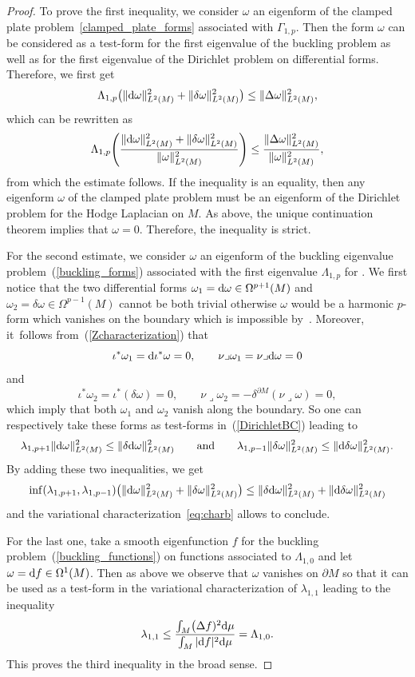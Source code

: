 \documentclass[10pt,a4paper]{amsart}
\numberwithin{equation}{section}
\theoremstyle{definition}
\begin{document}
\begin{proof} To prove the first inequality, we consider $\omega$ an eigenform of the clamped plate problem~\eqref{clamped_plate_forms} associated with $\Gamma_{1,p}$. Then the form $\omega$ can be considered as a test-form for the first eigenvalue of the buckling problem as well as for the first eigenvalue of the Dirichlet problem on differential forms. Therefore, we first get
\[
\Lambda_{1,p}\bigl(\|{\rm d}\omega\|^2_{L^2(M)} +\|\delta \omega\|^2_{L^2(M)}\bigr) \le \|\Delta \omega\|^2_{L^2(M)},
\]
which can be rewritten as
\[
\Lambda_{1,p} \Biggl(\frac{\|{\rm d}\omega\|^2_{L^2(M)} +\|\delta \omega\|^2_{L^2(M)}}{\| \omega\|^2_{L^2(M)}}\Biggr)\le \frac{\|\Delta \omega\|^2_{L^2(M)}}{\| \omega\|^2_{L^2(M)}},
\]
from which the estimate follows. If the inequality is an equality, then any eigenform $\omega$ of the clamped plate problem must be an eigenform of the Dirichlet problem for the Hodge Laplacian on $M$.
As above, the unique continuation theorem implies that $\omega=0$.
Therefore, the inequality is strict.


For the second estimate, we consider $\omega$ an eigenform of the buckling eigenvalue problem~(\ref{buckling_forms}) associated with the first eigenvalue $\Lambda_{1,p}$ for . We first notice that the two differential forms $\omega_1={\rm d}\omega\in\Omega^{p+1}(M)$ and $\omega_2=\delta\omega\in\Omega^{p-1}(M)$ cannot be both trivial otherwise $\omega$ would be a harmonic $p$-form which vanishes on the boundary which is impossible by~\cite{Anne89}. Moreover, it~follows from~(\ref{Zcharacterization}) that
\[
\iota^*\omega_1={\rm d}\iota^*\omega=0,\qquad \nu\lrcorner\omega_1=\nu\lrcorner {\rm d}\omega=0
\]
and
\[
\iota^*\omega_2=\iota^*(\delta\omega)=0,\qquad\nu\lrcorner\omega_2=-\delta^{\partial M}(\nu\lrcorner\omega)=0,
\]
which imply that both $\omega_1$ and $\omega_2$ vanish along the boundary. So one can respectively take these forms as test-forms in~(\ref{DirichletBC}) leading to
\[
\lambda_{1,p+1}\| {\rm d} \omega\|^2_{L^2(M)} \le \|\delta {\rm d} \omega\|^2_{L^2(M)} \qquad \text{and} \qquad \lambda_{1,p-1}\| \delta \omega\|^2_{L^2(M)} \le \|{\rm d}\delta \omega\|^2_{L^2(M)}.
\]
By adding these two inequalities, we get
\[
\inf(\lambda_{1,p+1}, \lambda_{1,p-1}) \bigl(\| {\rm d} \omega\|^2_{L^2(M)} + \| \delta \omega\|^2_{L^2(M)} \bigr) \le \|\delta {\rm d} \omega\|^2_{L^2(M)}+\|{\rm d}\delta \omega\|^2_{L^2(M)}
\]
and the variational characterization~\eqref{eq:charb} allows to conclude.

For the last one, take a smooth eigenfunction $f$ for the buckling problem~(\ref{buckling_functions}) on functions associated to $\Lambda_{1,0}$ and let $\omega={\rm d}f\in\Omega^1(M)$. Then as above we observe that $\omega$ vanishes on $\partial M$ so that it can be used as a test-form in the variational characterization of $\lambda_{1,1}$ leading to the inequality
\[
\lambda_{1,1}\leq \frac{\int_M\bigl(\Delta f)^2{\rm d}\mu}{\int_M |{\rm d}f|^2{\rm d}\mu}=\Lambda_{1,0}.
\]
This proves the third inequality in the broad sense.
\end{proof}
\end{document}

